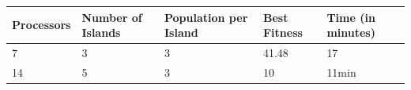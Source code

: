 \documentclass[]{article}
\begin{document}
\begin{longtable}[c]{@{}lllll@{}}
\toprule
\begin{minipage}[b]{0.17\columnwidth}\raggedright\strut
Processors
\strut\end{minipage} &
\begin{minipage}[b]{0.17\columnwidth}\raggedright\strut
Number of Islands
\strut\end{minipage} &
\begin{minipage}[b]{0.17\columnwidth}\raggedright\strut
Population per Island
\strut\end{minipage} &
\begin{minipage}[b]{0.17\columnwidth}\raggedright\strut
Best Fitness
\strut\end{minipage} &
\begin{minipage}[b]{0.17\columnwidth}\raggedright\strut
Time (in minutes)
\strut\end{minipage}\tabularnewline
\midrule
\endhead
\begin{minipage}[t]{0.17\columnwidth}\raggedright\strut
7
\strut\end{minipage} &
\begin{minipage}[t]{0.17\columnwidth}\raggedright\strut
3
\strut\end{minipage} &
\begin{minipage}[t]{0.17\columnwidth}\raggedright\strut
3
\strut\end{minipage} &
\begin{minipage}[t]{0.17\columnwidth}\raggedright\strut
41.48
\strut\end{minipage} &
\begin{minipage}[t]{0.17\columnwidth}\raggedright\strut
17
\strut\end{minipage}\tabularnewline
\begin{minipage}[t]{0.17\columnwidth}\raggedright\strut
14
\strut\end{minipage} &
\begin{minipage}[t]{0.17\columnwidth}\raggedright\strut
5
\strut\end{minipage} &
\begin{minipage}[t]{0.17\columnwidth}\raggedright\strut
3
\strut\end{minipage} &
\begin{minipage}[t]{0.17\columnwidth}\raggedright\strut
10
\strut\end{minipage} &
\begin{minipage}[t]{0.17\columnwidth}\raggedright\strut
11min
\strut\end{minipage}\tabularnewline

\end{longtable}
\end{document}
